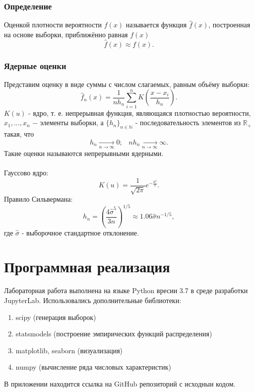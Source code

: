 \documentclass{article}
\begin{document}
\subsubsection{Определение}
\noindent Оценкой плотности вероятности $f(x)$ называется функция $\widehat{f}(x)$, построенная на основе выборки, приближённо равная $f(x)$
\begin{equation}
    \widehat{f}(x)\approx f(x).
\end{equation}
\subsubsection{Ядерные оценки}
\noindent Представим оценку в виде суммы с числом слагаемых, равным объёму выборки:
\begin{equation}
    \widehat{f}_n(x)=\frac{1}{n h_n}\sum_{i=1}^n K\left(\frac{x-x_i}{h_n}\right).
\end{equation}
$K(u)$ - ядро, т. е. непрерывная функция, являющаяся плотностью вероятности, $x_1,...,x_n$ $-$ элементы выборки, а $\{h_n\}_{n\in\mathbb{N}}$ - последовательность элементов из $\mathbb{R}_+$ такая, что
\begin{equation}
    h_n\xrightarrow[n\to\infty]{}0;\;\;\;n h_n\xrightarrow[n\to\infty]{}\infty.
\end{equation}
Такие оценки называются непрерывными ядерными.\\\\
Гауссово ядро:
\begin{equation}
    K(u)=\frac{1}{\sqrt{2\pi}}e^{-\frac{u^2}{2}}.
\end{equation}
Правило Сильвермана:
\begin{equation}
    h_n=\left(\frac{4\hat{\sigma}^5}{3n}\right)^{1/5}\approx1.06\hat{\sigma}n^{-1/5},
\end{equation}
где $\hat{\sigma}$ - выборочное стандартное отклонение.

\section {Программная реализация} 	
\noindent Лабораторная работа выполнена на языке Python вресии 3.7 в среде разработки JupyterLab. Использовались дополнительные библиотеки:
 \begin{enumerate}
        \item scipy (генерация выборок)
        \item statsmodels (построение эмпирических функций распределения)
        \item matplotlib, seaborn (визуализация)
        \item numpy (вычисление ряда числовых характеристик)
    \end{enumerate}
В приложении находится ссылка на GitHub репозиторий с исходныи кодом.
\end{document}
